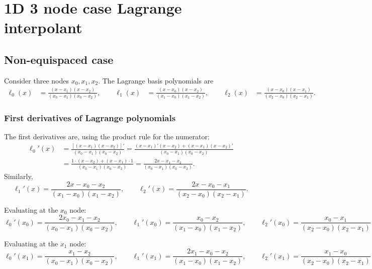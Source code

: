 \section{1D 3 node case Lagrange interpolant }
\label{sec::3_nodeLagrange}

\subsection{Non-equispaced case}

Consider three nodes \(x_0, x_1, x_2\). The Lagrange basis polynomials are
\[
\begin{aligned}
\ell_0(x) &= \frac{(x-x_1)(x-x_2)}{(x_0-x_1)(x_0-x_2)}, \qquad
\ell_1(x) &= \frac{(x-x_0)(x-x_2)}{(x_1-x_0)(x_1-x_2)}, \qquad
\ell_2(x) &= \frac{(x-x_0)(x-x_1)}{(x_2-x_0)(x_2-x_1)}.
\end{aligned}
\]

\subsubsection{First derivatives of Lagrange polynomials}

The first derivatives are, using the product rule for the numerator:
\[
\begin{aligned}
\ell_0'(x) &= \frac{[(x-x_1)(x-x_2)]'}{(x_0-x_1)(x_0-x_2)}
= \frac{(x-x_1)'(x-x_2) + (x-x_1)(x-x_2)'}{(x_0-x_1)(x_0-x_2)} \\[1.5ex]
&= \frac{1\cdot(x-x_2) + (x-x_1)\cdot 1}{(x_0-x_1)(x_0-x_2)}
= \frac{2x - x_1 - x_2}{(x_0-x_1)(x_0-x_2)}.
\end{aligned}
\]
Similarly,
\[
\ell_1'(x) = \frac{2x - x_0 - x_2}{(x_1-x_0)(x_1-x_2)}, \qquad
\ell_2'(x) = \frac{2x - x_0 - x_1}{(x_2-x_0)(x_2-x_1)}.
\]

\vspace{2em}

Evaluating at the \(x_0\) node:
\[
\ell_0'(x_0) = \frac{2x_0 - x_1 - x_2}{(x_0-x_1)(x_0-x_2)}, \qquad
\ell_1'(x_0) = \frac{x_0 - x_2}{(x_1-x_0)(x_1-x_2)}, \qquad
\ell_2'(x_0) = \frac{x_0 - x_1}{(x_2-x_0)(x_2-x_1)}
\]

\vspace{2em}

Evaluating at the \(x_1\) node:
\[
\ell_0'(x_1) = \frac{x_1 - x_2}{(x_0-x_1)(x_0-x_2)}, \qquad
\ell_1'(x_1) = \frac{2x_1 - x_0 - x_2}{(x_1-x_0)(x_1-x_2)}, \qquad
\ell_2'(x_1) = \frac{x_1 - x_0}{(x_2-x_0)(x_2-x_1)}
\]

\vspace{2em}


